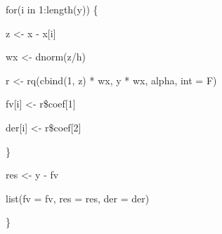 \begin{enumerate}
{\hspace{10mm} for(i in 1:length(y)) \{ 

\hspace{20mm} z <- x - x[i] 

\hspace{20mm} wx <- dnorm(z/h) 

\hspace {20mm} r <- rq(cbind(1, z) * wx, y * wx, alpha, int = F) 

\hspace{20mm} fv[i] <- r\$coef[1] 

\hspace{20mm} der[i] <- r\$coef[2] 

\hspace{30mm} \} 

\hspace{10mm} res <- y - fv 

\hspace{10mm} list(fv = fv, res = res, der = der) 

\hspace{10mm} \}
}

%

\end{enumerate}

